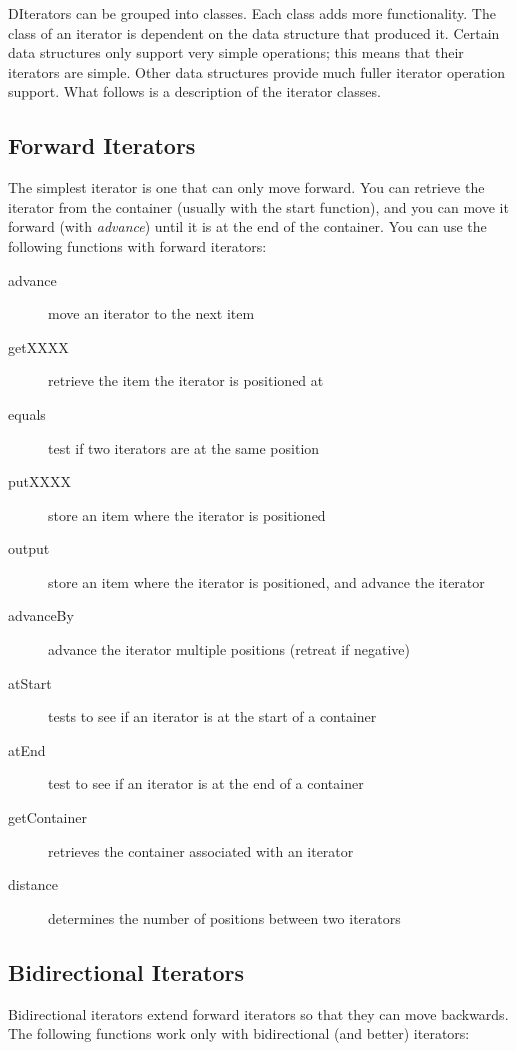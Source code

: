 \documentclass{report}
\begin{document}
DIterators can be grouped into classes. Each class adds more functionality.
The class of an iterator is dependent on the data structure that produced
it. Certain data structures only support very simple operations; this means
that their iterators are simple. Other data structures provide much fuller
iterator operation support. What follows is a description of the iterator
classes.

\subsection{Forward Iterators}

The simplest iterator is one that can only move forward.  You can retrieve
the iterator from the container (usually with the start function), and you
can move it forward (with \emph{advance}) until it is at the end of the
container. You can use the following functions with forward iterators:

\begin{description}
\item[advance] move an iterator to the next item
\item[getXXXX] retrieve the item the iterator is positioned at
\item[equals] test if two iterators are at the same position
\item[putXXXX] store an item where the iterator is positioned
\item[output] store an item where the iterator is positioned, and advance the iterator
\item[advanceBy] advance the iterator multiple positions (retreat if negative)
\item[atStart] tests to see if an iterator is at the start of a container
\item[atEnd] test to see if an iterator is at the end of a container
\item[getContainer] retrieves the container associated with an iterator
\item[distance] determines the number of positions between two iterators
\end{description}

\subsection{Bidirectional Iterators}

Bidirectional iterators extend forward iterators so that they can move
backwards. The following functions work only with bidirectional (and better)
iterators:
\end{document}
